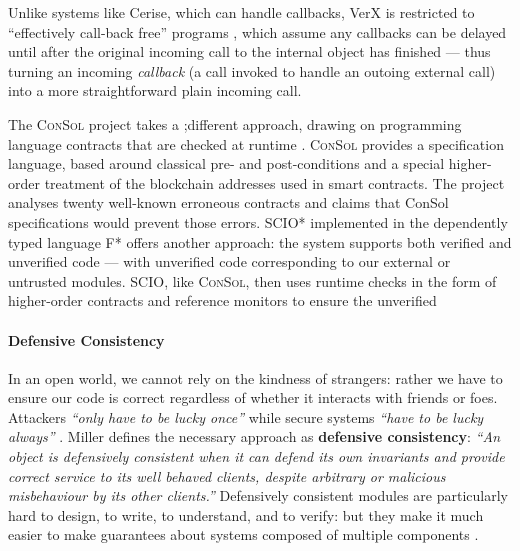 Unlike systems like Cerise, which can handle callbacks, VerX
is restricted to ``effectively call-back free'' programs
\cite{Grossman,Albert,relaxed-callbacks-ToDES}, which assume any callbacks can be delayed until after the
original incoming call to the internal object has finished 
--- thus turning an incoming \textit{callback} (a call invoked 
to handle an outoing external call) into a more straightforward plain
incoming call. 


The \textsc{ConSol} project \cite{consolidating-pldi2024} takes a
;different approach, drawing on programming language contracts that are
checked at runtime \cite{FinFel01}. \textsc{ConSol} provides a
specification language, based around classical pre- and post-conditions and
a special higher-order treatment of the blockchain addresses used in
smart contracts. The project analyses twenty well-known erroneous
contracts and claims that ConSol specifications would prevent those
errors.
SCIO* \cite{secure-io-fstar-popl2024} implemented in the dependently
typed language F* offers another approach: the system supports both
verified and unverified code --- with unverified code 
corresponding to our external or untrusted modules.  SCIO,
like \textsc{ConSol}, then uses runtime checks in the form of
higher-order contracts and reference monitors to ensure the unverified










\paragraph{Defensive Consistency}


In an open world, we cannot rely on the kindness of strangers: rather
we have to ensure our code is correct regardless of whether it
interacts with friends or foes.
Attackers 
\textit{``only have to be lucky once''} while secure systems 
\textit{``have to be lucky always''} \cite{IRAThatcher}.
Miller \cite{miller-esop2013,MillerPhD} defines the necessary approach
as \textbf{defensive consistency}: \textit{``An object is defensively
  consistent when it can defend its own invariants and provide correct
  service to its well behaved clients, despite arbitrary or malicious
  misbehaviour by its other clients.''}  Defensively consistent
modules are particularly hard to design, to write, to understand, and
to verify: but
they make it much
easier to make guarantees about systems composed of multiple components
\cite{Murray10dphil}.









